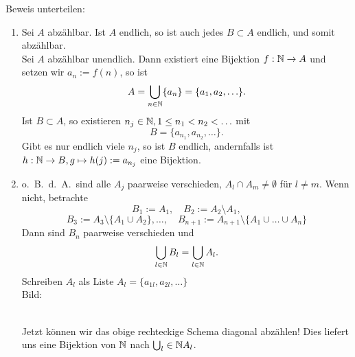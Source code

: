 \documentclass[../ana1.tex]{subfiles}
\begin{document}
\begin{bew}
	Beweis unterteilen:
	\begin{enumerate}
		\item Sei \(A\) abzählbar. Ist \(A\) endlich, so ist auch jedes \(B\subset A\) endlich, und somit abzählbar.\\
		      Sei \(A\) abzählbar unendlich. Dann existiert eine Bijektion \(f: \mathbb{N} \rightarrow A\) und setzen wir \(a_n := f(n)\), so ist
		      \[ A = \bigcup_{n\in\mathbb{N}} \{a_n\} = \{a_1, a_2,\ldots \}.\]
			  Ist \(B\subset A\), so existieren \(n_j \in\mathbb{N}, 1\leq n_1<n_2<\ldots \) mit 
			  \[ B = \{a_{n_1}, a_{n_2}, \ldots \}.\]
		      Gibt es nur endlich viele \(n_j\), so ist \(B\) endlich, andernfalls ist \(h: \mathbb{N} \rightarrow B, g \mapsto h(j) := a_{n_j}\)
		      eine Bijektion.
		\item o.\ B.\ d.\ A.\ sind alle \(A_j\) paarweise verschieden, \(A_l \cap A_m \neq \emptyset \) für \(l\neq m\).
		      Wenn nicht, betrachte
		      \[ B_1 := A_1, \quad B_2 := A_2 \setminus A_1,\]
		      \[ B_3 := A_3 \setminus \{A_1 \cup A_2\}, \ldots, \quad B_{n+1} := A_{n+1} \setminus \{A_1\cup\ldots\cup A_n\} \]
		      Dann sind \(B_n\) paarweise verschieden und \[\bigcup_{l\in\mathbb{N}} B_l = \bigcup_{l\in\mathbb{N}} A_l.\]
		      Schreiben \(A_l\) als Liste \(A_l = \{a_{1l}, a_{2l}, \ldots \} \) \\
		      Bild:\\
		      \\Jetzt können wir das obige rechteckige Schema diagonal abzählen! Dies liefert uns eine Bijektion von \(\mathbb{N} \) nach \(\bigcup_l\in\mathbb{N} A_l\).
	\end{enumerate}
\end{bew}
\end{document}
